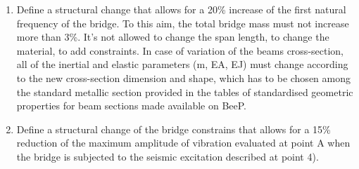 \documentclass[10pt,a4paper,final]{report}
\begin{document}
\begin{enumerate}
{\begin{enumerate}
\item {Define a structural change that allows for a 20\% increase of the first natural frequency of the bridge. To this aim, the total bridge mass must not increase more than 3\%. It’s not allowed to change the span length, to change the material, to add constraints. In case of variation of the beams cross-section, all of the inertial and elastic parameters (m, EA, EJ) must change according to the new cross-section dimension and shape, which has to be chosen among the standard metallic section provided in the tables of standardised geometric properties for beam sections made available on BeeP.}
\item { Define a structural change of the bridge constrains that allows for a 15\% reduction of the maximum amplitude of vibration evaluated at point A when the bridge is subjected to the seismic excitation described at point 4).}
\end{enumerate}
}
\end{enumerate}
\newpage
\end{document}
